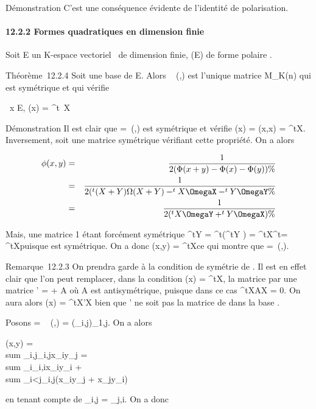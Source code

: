 \documentclass[]{article}
\begin{document}
Démonstration C'est une conséquence évidente de l'identité de
polarisation.

\paragraph{12.2.2 Formes quadratiques en dimension finie}

Soit E un K-espace vectoriel ~de dimension finie, \Phi \inQ(E) de forme
polaire \phi.

Théorème~12.2.4 Soit  une base de E. Alors
\mathrmMat~ (\phi,) est
l'unique matrice \Omega \in M_K(n) qui est symétrique et qui vérifie

\forall~x \in E, \Phi(x) = ^t~X\OmegaX

Démonstration Il est clair que \Omega =\
\mathrmMat (\Phi,) est symétrique et vérifie \Phi(x) =
\phi(x,x) = ^tX\OmegaX. Inversement, soit \Omega une matrice symétrique
vérifiant cette propriété. On a alors

\begin{align*} \phi(x,y)& =& 1 \over
2 (\Phi(x + y) - \Phi(x) - \Phi(y)) \%& \\ &
=& 1 \over 2 (^t(X + Y )\Omega(X + Y )
-^tX\OmegaX -^tY \OmegaY \%&
\\ & =& 1 \over 2
(^tX\OmegaY + ^tY \OmegaX) \%&
\\ \end{align*}

Mais, une matrice 1  étant forcément symétrique ^tY \OmegaX =
^t(^tY \OmegaX) = ^tX^t\OmegaY =
^tX\OmegaY puisque \Omega est symétrique. On a donc \phi(x,y) =
^tX\OmegaY ce qui montre que \Omega =\
\mathrmMat (\phi,).

Remarque~12.2.3 On prendra garde à la condition de symétrie de \Omega. Il est
en effet clair que l'on peut remplacer, dans la condition \Phi(x) =
^tX\OmegaX, la matrice \Omega par une matrice \Omega' = \Omega + A où A est
antisymétrique, puisque dans ce cas ^tXAX = 0. On aura alors
\Phi(x) = ^tX\Omega'X bien que \Omega' ne soit pas la matrice de \Phi dans la
base \mathcal{E}.

Posons \Omega = \mathrmMat~ (\phi,)
= (\omega_i,j)_1\leqi,j\leqn. On a alors

\phi(x,y) = \\sum
_i,j\omega_i,jx_iy_j =
\\sum
_i\omega_i,ix_iy_i +
\\sum
_i<j\omega_i,j(x_iy_j +
x_jy_i)

en tenant compte de \omega_i,j = \omega_j,i. On a donc
\end{document}
